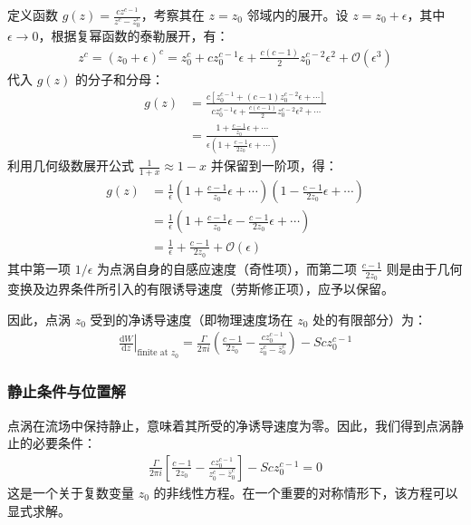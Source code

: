 定义函数 $g(z) = \frac{cz^{c-1}}{z^{c}-z_{0}^{c}}$，考察其在 $z = z_0$ 邻域内的展开。设 $z = z_0 + \epsilon$，其中 $\epsilon \to 0$，根据复幂函数的泰勒展开，有：
\begin{align*}
    z^{c} = (z_{0}+\epsilon)^{c} = z_{0}^{c} + cz_{0}^{c-1}\epsilon + \frac{c(c-1)}{2}z_{0}^{c-2}\epsilon^{2} + \mathcal{O}(\epsilon^3)
\end{align*}
代入 $g(z)$ 的分子和分母：
\begin{align*}
    g(z) &= \frac{c\left[z_{0}^{c-1}+(c-1)z_{0}^{c-2}\epsilon+\cdots\right]}{cz_{0}^{c-1}\epsilon+\frac{c(c-1)}{2}z_{0}^{c-2}\epsilon^{2}+\cdots} \\
    &= \frac{1+\frac{c-1}{z_{0}}\epsilon+\cdots}{\epsilon\left(1+\frac{c-1}{2z_{0}}\epsilon+\cdots\right)}
\end{align*}
利用几何级数展开公式 $\frac{1}{1+x} \approx 1 - x$ 并保留到一阶项，得：
\begin{align*}
    g(z) &= \frac{1}{\epsilon} \left(1 + \frac{c-1}{z_{0}}\epsilon + \cdots \right) \left(1 - \frac{c-1}{2z_{0}}\epsilon + \cdots \right) \\
    &= \frac{1}{\epsilon} \left(1 + \frac{c-1}{z_0}\epsilon - \frac{c-1}{2z_0}\epsilon + \cdots \right) \\
    &= \frac{1}{\epsilon} + \frac{c-1}{2z_{0}} + \mathcal{O}(\epsilon)
\end{align*}
其中第一项 $1/\epsilon$ 为点涡自身的自感应速度（奇性项），而第二项 $\frac{c-1}{2z_0}$ 则是由于几何变换及边界条件所引入的有限诱导速度（劳斯修正项），应予以保留。

因此，点涡 $z_0$ 受到的净诱导速度（即物理速度场在 $z_0$ 处的有限部分）为：
\begin{align}
    \left. \frac{\mathrm{d}W}{\mathrm{d}z} \right|_{\text{finite at } z_0} = \frac{\Gamma}{2\pi i} \left( \frac{c-1}{2z_0} - \frac{cz_0^{c-1}}{z_0^{c} - \bar{z}_0^{c}} \right) - Scz_0^{c-1}
\end{align}

\subsubsection{静止条件与位置解}

点涡在流场中保持静止，意味着其所受的净诱导速度为零。因此，我们得到点涡静止的必要条件：
\begin{align}
    \boxed{
    \frac{\Gamma}{2\pi i} \left[ \frac{c-1}{2z_0} - \frac{c z_0^{c-1}}{z_0^c - \bar{z}_0^c} \right] - S c z_0^{c-1} = 0
    }
\end{align}
这是一个关于复数变量 $z_0$ 的非线性方程。在一个重要的对称情形下，该方程可以显式求解。

